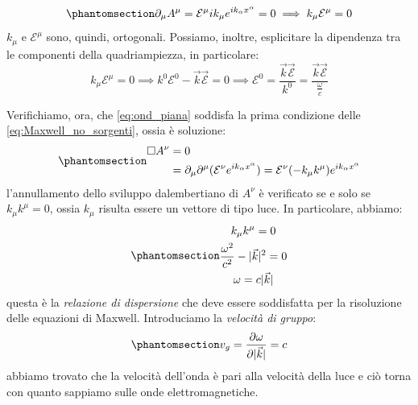 \begin{equation}\phantomsection\label{eq:Cond_gauge_Loretz}
        \partial_\mu A^\mu=\mathcal{E}^\mu ik_\mu e^{ik_\alpha x^\alpha}=0 \implies k_\mu\mathcal{E}^\mu=0
\end{equation}
$k_\mu$ e $\mathcal{E}^\mu$ sono, quindi, ortogonali. Possiamo, inoltre, esplicitare la dipendenza tra le componenti della quadriampiezza, in particolare:
\begin{equation}
         k_\mu\mathcal{E}^\mu=0 \implies k^0\mathcal{E}^0-\Vec{k}\Vec{\mathcal{E}}=0 \implies \mathcal{E}^0=\dfrac{\Vec{k}\Vec{\mathcal{E}}}{k^0}=\dfrac{\Vec{k}\Vec{\mathcal{E}}}{\frac{\omega}{c  }}
\end{equation}

Verifichiamo, ora, che \eqref{eq:ond_piana} soddisfa la  prima condizione delle \eqref{eq:Maxwell_no_sorgenti}, ossia è soluzione: 
\begin{equation}\phantomsection\label{eq:Maxwell_ond_pia}
    \begin{split}
        \Box A^\nu&=0\\
        &=\partial_\mu\partial^\mu(\mathcal{E}^\nu e^{ik_\alpha x^\alpha})=\mathcal{E}^\nu (-k_\mu k^\mu)e^{ik_\alpha x^\alpha}
    \end{split}
\end{equation}
l'annullamento dello sviluppo dalembertiano di $A^\nu$ è verificato se e solo se $k_\mu k^\mu=0$, ossia $k_\mu$ risulta essere un vettore di tipo luce. In particolare, abbiamo:
\begin{equation}\phantomsection\label{eq:rel_disp}
 \begin{gathered}
     k_\mu k^\mu=0\\
     \dfrac{\omega^2}{c^2}-|\Vec{k}|^2=0\\
     \omega=c|\Vec{k}|
 \end{gathered}
\end{equation}
questa è la \textit{relazione di dispersione} che deve essere soddisfatta per la risoluzione delle equazioni di Maxwell. Introduciamo la \textit{velocità di gruppo}:
\begin{equation}\phantomsection\label{eq:vel_grup}
    v_g=\dfrac{\partial\omega}{\partial|\Vec{k}|}=c
\end{equation}
abbiamo trovato che la velocità dell'onda è pari alla velocità della luce e ciò torna con quanto sappiamo sulle onde elettromagnetiche.

